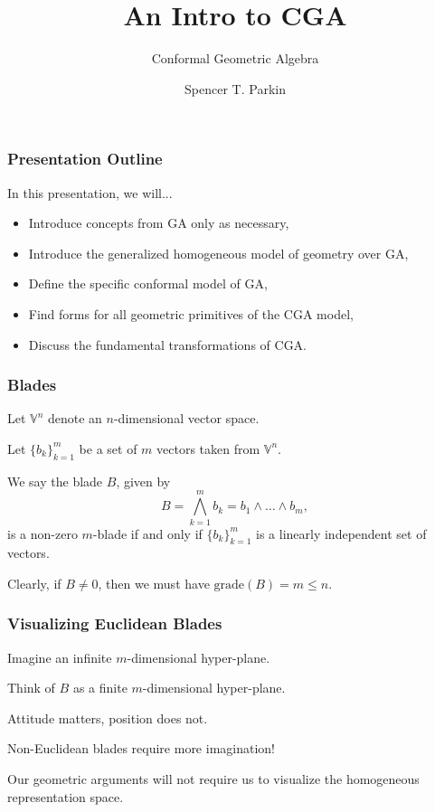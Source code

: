 \documentclass{beamer}
\title{An Intro to CGA}
\subtitle{Conformal Geometric Algebra}
\author{Spencer T. Parkin}
\institute{Avalanche Software}
\newcommand{\V}{\mathbb{V}}
\newcommand{\grade}{\mbox{grade}}
\begin{document}
\frame{\titlepage}

\begin{frame}
\frametitle{Presentation Outline}
In this presentation, we will...\pause
\begin{itemize}
\item Introduce concepts from GA only as necessary,\pause
\item Introduce the generalized homogeneous model of geometry over GA,\pause
\item Define the specific conformal model of GA,\pause
\item Find forms for all geometric primitives of the CGA model,\pause
\item Discuss the fundamental transformations of CGA.
\end{itemize}
\end{frame}

\begin{frame}
\frametitle{Blades}
Let $\V^n$ denote an $n$-dimensional vector space.\pause

Let $\{b_k\}_{k=1}^m$ be a set of $m$ vectors taken from $\V^n$.\pause
\begin{definition}
We say the blade $B$, given by
\begin{equation*}
B = \bigwedge_{k=1}^m b_k = b_1\wedge\dots\wedge b_m,
\end{equation*}
is a non-zero $m$-blade if and only if $\{b_k\}_{k=1}^m$
is a linearly independent set of vectors.
\end{definition}\pause
Clearly, if $B\neq 0$, then we must have $\grade(B)=m\leq n$.
\end{frame}

\begin{frame}
\frametitle{Visualizing Euclidean Blades}
Imagine an \alert{infinite} $m$-dimensional hyper-plane.\pause

Think of $B$ as a \alert{finite} $m$-dimensional hyper-plane.\pause

\alert{Attitude} matters, \alert{position} does not.\pause

\alert{Non-Euclidean} blades require more imagination!\pause

Our geometric arguments will not require us to visualize the homogeneous representation space.
\end{frame}
\end{document}
